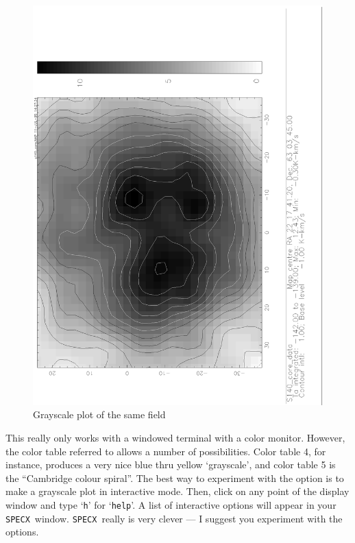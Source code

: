 \documentclass[11pt,twoside]{article}
\newcommand{\SPECX}{{\tt SPECX}}
\begin{document}
\begin{figure}[htb]
\centering
\includegraphics[angle=-90,width=5in]{sc8_gray.ps}
\vspace*{-0.5cm}
\begin{center}
\begin{minipage}[t]{4in}
\caption[A gray-scale plot with contours]
{\small{Grayscale plot of the same field}
}
\label{fig:specx_gray}
\end{minipage}
\end{center}
\end{figure}

This really only works with a windowed terminal with a color
monitor. However, the color table referred to allows a number of
possibilities. Color table 4, for instance, produces a very nice blue
thru yellow `grayscale', and color table 5 is the ``Cambridge colour
spiral''. The best way to experiment with the option is to make a
grayscale plot in interactive mode.  Then, click on any point of the
display window and type `{\tt h}' for `{\tt help}'. A list of
interactive options will appear in your \SPECX\ window. \SPECX\ really
is very clever --- I suggest you experiment with the options.
\end{document}
